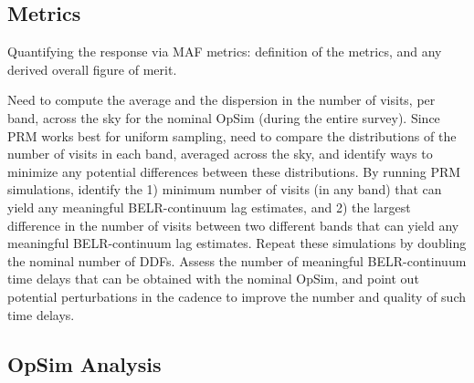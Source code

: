 

\subsection{Metrics}
\label{sec:\secname:metrics}

Quantifying the response via MAF metrics: definition of the metrics,
and any derived overall figure of merit.



Need to compute the average and the dispersion in the
number of visits, per band, across the sky for the nominal OpSim
(during the entire survey). Since PRM works best for uniform sampling,
need to compare the distributions of the number of visits in each
band, averaged across the sky, and identify ways to minimize any
potential differences between these distributions. By running PRM
simulations, identify the 1) minimum number of visits (in any band)
that can yield any meaningful BELR-continuum lag estimates, and 2) the
largest difference in the number of visits between two different bands
that can yield any meaningful BELR-continuum lag estimates. Repeat
these simulations by doubling the nominal number of DDFs. Assess the
number of meaningful BELR-continuum time delays that can be obtained
with the nominal OpSim, and point out potential perturbations in the
cadence to improve the number and quality of such time delays.




\subsection{OpSim Analysis}
\label{sec:\secname:analysis}

